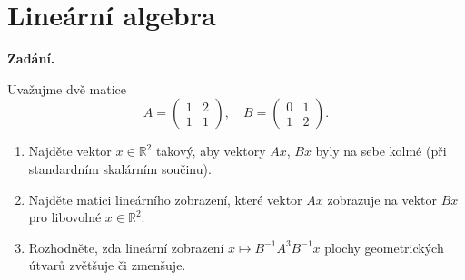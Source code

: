 \section{Lineární algebra}

\noindent\textbf{Zadání.}\par
Uvažujme dvě matice
\[
  A = \begin{pmatrix} 1 & 2 \\ 1 & 1 \end{pmatrix}, \quad
  B = \begin{pmatrix} 0 & 1 \\ 1 & 2 \end{pmatrix}.
\]
\begin{enumerate}
  \item Najděte vektor $x \in \mathbb{R}^2$ takový, aby vektory $Ax$, $Bx$ byly na sebe kolmé (při standardním skalárním součinu).
  \item Najděte matici lineárního zobrazení, které vektor $Ax$ zobrazuje na vektor $Bx$ pro libovolné $x \in \mathbb{R}^2$.
  \item Rozhodněte, zda lineární zobrazení $x \mapsto B^{-1} A^3 B^{-1} x$ plochy geometrických útvarů zvětšuje či zmenšuje.
\end{enumerate}

